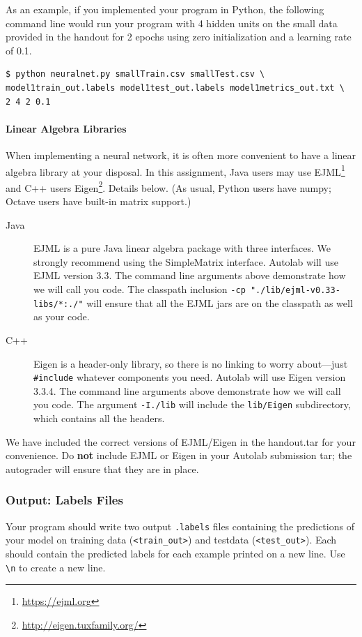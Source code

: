\documentclass[11pt]{exam}
\numberwithin{equation}{section} %
\numberwithin{figure}{section} %
\numberwithin{table}{section} %
\newcommand{\ntset}{test}
\begin{document}
As an example, if you implemented your program in Python, the following command line would run your program with 4 hidden units on the small data provided in the handout for 2 epochs using zero initialization and a learning rate of 0.1.
\\
\begin{lstlisting}[language=Shell]
$ python neuralnet.py smallTrain.csv smallTest.csv \ 
model1train_out.labels model1test_out.labels model1metrics_out.txt \ 
2 4 2 0.1
\end{lstlisting}

\begin{notebox}
\paragraph{Linear Algebra Libraries} When implementing a neural network, it is often more convenient to have a linear algebra library at your disposal. In this assignment, Java users may use EJML\footnote{\url{https://ejml.org}} and C++ users Eigen\footnote{\url{http://eigen.tuxfamily.org/}}. Details below. 
%
(As usual, Python users have numpy; Octave users have built-in matrix support.)
%
\begin{description}
\item[Java] EJML is a pure Java linear algebra package with three interfaces. We strongly recommend using the SimpleMatrix interface. Autolab will use EJML version 3.3. The command line arguments above demonstrate how we will call you code. The classpath inclusion \lstinline{-cp "./lib/ejml-v0.33-libs/*:./"} will ensure that all the EJML jars are on the classpath as well as your code. 
\item[C++] Eigen is a header-only library, so there is no linking to worry about---just \lstinline{#include} whatever components you need. Autolab will use Eigen version 3.3.4. The command line arguments above demonstrate how we will call you code. The argument \lstinline{-I./lib} will include the \lstinline{lib/Eigen} subdirectory, which contains all the headers.
\end{description} 
We have included the correct versions of EJML/Eigen in the handout.tar for your convenience. Do {\bf not} include EJML or Eigen in your Autolab submission tar; the autograder will ensure that they are in place. 
\end{notebox}

\subsubsection{Output: Labels Files} \label{output}
Your program should write two output \texttt{.labels} files containing the predictions of your model on training data (\texttt{<train\_out>}) and \ntset\thinspace data (\texttt{<\ntset\_out>}). Each should contain the predicted labels for each example printed on a new line. Use \lstinline{\n} to create a new line. 
\end{document}
